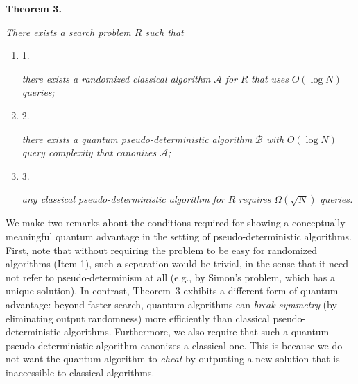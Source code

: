 \documentclass[10pt,a4paper]{article}
\begin{document}


\par\medskip\noindent\textbf{
\textbf{Theorem 3}\textbf{.}
}\par



\emph{There exists a search problem ${R}$ such that}\par


\begin{enumerate}


\item[] 
1. 


\emph{there exists a randomized classical algorithm }$\mathcal{A}$\emph{ for }${R}$\emph{ that uses }$O(\log N)$\emph{ queries;}\par





\item[] 
2. 


\emph{there exists a quantum pseudo-deterministic algorithm }$\mathcal{B}$\emph{ with }$O(\log N)$\emph{ query complexity that canonizes }$\mathcal{A}$\emph{;}\par





\item[] 
3. 


\emph{any classical pseudo-deterministic algorithm for }${R}$\emph{ requires }$\Omega(\sqrt{N})$\emph{ queries.}\par





\end{enumerate}







We make two remarks about the conditions required for showing a conceptually meaningful quantum advantage in the setting of pseudo-deterministic algorithms. First, note that without requiring the problem to be easy for randomized algorithms (Item 1), such a separation would be trivial, in the sense that it need not refer to pseudo-determinism at all (e.g., by Simon’s problem, which has a unique solution). In contrast, Theorem 3 exhibits a different form of quantum advantage: beyond faster search, quantum algorithms can \emph{break symmetry} (by eliminating output randomness) more efficiently than classical pseudo-deterministic algorithms.
Furthermore, we also require that such a quantum pseudo-deterministic algorithm canonizes a classical one. This is because we do not want the quantum algorithm to \emph{cheat} by outputting a new solution that is inaccessible to classical algorithms.\par
\end{document}
